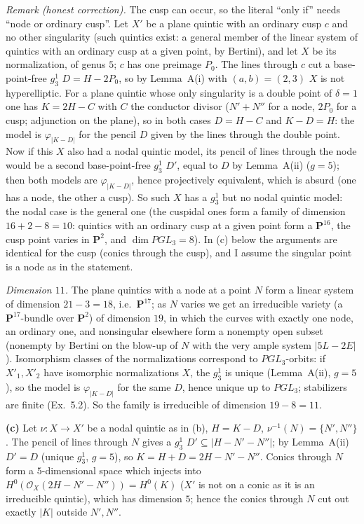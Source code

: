 \documentclass[11pt]{article}
\begin{document}
\emph{Remark (honest correction).} The cusp can occur, so the literal ``only if'' needs ``node or ordinary cusp''. Let $X'$ be a plane quintic with an ordinary cusp $c$ and no other singularity (such quintics exist: a general member of the linear system of quintics with an ordinary cusp at a given point, by Bertini), and let $X$ be its normalization, of genus $5$; $c$ has one preimage $P_0$. The lines through $c$ cut a base-point-free $g^1_3$ $D=H-2P_0$, so by Lemma~A(i) with $(a,b)=(2,3)$ $X$ is not hyperelliptic. For a plane quintic whose only singularity is a double point of $\delta=1$ one has $K=2H-C$ with $C$ the conductor divisor ($N'+N''$ for a node, $2P_0$ for a cusp; adjunction on the plane), so in both cases $D=H-C$ and $K-D=H$: the model is $\varphi_{|K-D|}$ for the pencil $D$ given by the lines through the double point. Now if this $X$ also had a nodal quintic model, its pencil of lines through the node would be a second base-point-free $g^1_3$ $D'$, equal to $D$ by Lemma~A(ii) ($g=5$); then both models are $\varphi_{|K-D|}$, hence projectively equivalent, which is absurd (one has a node, the other a cusp). So such $X$ has a $g^1_3$ but no nodal quintic model: the nodal case is the general one (the cuspidal ones form a family of dimension $16+2-8=10$: quintics with an ordinary cusp at a given point form a $\mathbf P^{16}$, the cusp point varies in $\mathbf P^2$, and $\dim PGL_3=8$). In (c) below the arguments are identical for the cusp (conics through the cusp), and I assume the singular point is a node as in the statement.

\emph{Dimension $11$.} The plane quintics with a node at a point $N$ form a linear system of dimension $21-3=18$, i.e.\ $\mathbf P^{17}$; as $N$ varies we get an irreducible variety (a $\mathbf P^{17}$-bundle over $\mathbf P^2$) of dimension $19$, in which the curves with exactly one node, an ordinary one, and nonsingular elsewhere form a nonempty open subset (nonempty by Bertini on the blow-up of $N$ with the very ample system $|5L-2E|$). Isomorphism classes of the normalizations correspond to $PGL_3$-orbits: if $X'_1,X'_2$ have isomorphic normalizations $X$, the $g^1_3$ is unique (Lemma~A(ii), $g=5$), so the model is $\varphi_{|K-D|}$ for the same $D$, hence unique up to $PGL_3$; stabilizers are finite (Ex.~5.2). So the family is irreducible of dimension $19-8=11$.

\textbf{(c)} Let $\nu:X\to X'$ be a nodal quintic as in (b), $H=K-D$, $\nu^{-1}(N)=\{N',N''\}$. The pencil of lines through $N$ gives a $g^1_3$ $D'\subseteq|H-N'-N''|$; by Lemma~A(ii) $D'=D$ (unique $g^1_3$, $g=5$), so $K=H+D=2H-N'-N''$. Conics through $N$ form a $5$-dimensional space which injects into $H^0(\mathcal O_X(2H-N'-N''))=H^0(K)$ ($X'$ is not on a conic as it is an irreducible quintic), which has dimension $5$; hence the conics through $N$ cut out exactly $|K|$ outside $N',N''$.
\end{document}
